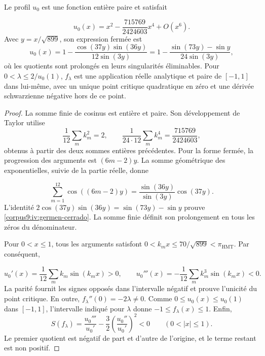 \begin{proposition}
\label{corpus9:iv:germen-analitico}
Le profil \(u_0\) est une fonction entière paire et satisfait

\[
 u_0(x)=x^2-\frac{715769}{2424603}x^4+O(x^6).
\]
Avec \(y=x/\sqrt{899}\), son expression fermée est
\begin{equation}
 u_0(x)
  =1-\frac{\cos(37y)\sin(36y)}{12\sin(3y)}
  =1-\frac{\sin(73y)-\sin y}{24\sin(3y)},
 \label{corpus9:iv:germen-cerrado}
\end{equation}
où les quotients sont prolongés en leurs singularités éliminables.
Pour \(0<\lambda\leq2/u_0(1)\), \(f_\lambda\) est une
application réelle analytique et paire de \([-1,1]\) dans lui-même, avec un
unique point critique quadratique en zéro et une dérivée schwarzienne négative
hors de ce point.
\end{proposition}
\begin{proof}
La somme finie de cosinus est entière et paire. Son développement de
Taylor utilise
\[
 \frac1{12}\sum_m k_m^2=2,\qquad
 \frac1{24\cdot12}\sum_m k_m^4=\frac{715769}{2424603},
\]
obtenus à partir des deux sommes entières précédentes. Pour la forme
fermée, la progression des arguments est \((6m-2)y\). La somme
géométrique des exponentielles, suivie de la partie réelle, donne

\[
 \sum_{m=1}^{12}\cos((6m-2)y)
   =\frac{\sin(36y)}{\sin(3y)}\cos(37y).
\]
L’identité \(2\cos(37y)\sin(36y)=\sin(73y)-\sin y\)
prouve \eqref{corpus9:iv:germen-cerrado}. La somme finie définit
son prolongement en tous les zéros du dénominateur.

Pour \(0<x\leq1\), tous les arguments satisfont
\(0<k_mx\leq70/\sqrt{899}<\pi_{\mathrm{HMT}}\). Par conséquent,

\[
 u_0'(x)=\frac1{12}\sum_m k_m\sin(k_mx)>0,\qquad
 u_0'''(x)=-\frac1{12}\sum_m k_m^3\sin(k_mx)<0.
\]
La parité fournit les signes opposés dans l’intervalle
négatif et prouve l’unicité du point critique. En outre,
\(f_\lambda''(0)=-2\lambda\ne0\). Comme
\(0\leq u_0(x)\leq u_0(1)\) dans \([-1,1]\), l’intervalle
indiqué pour \(\lambda\) donne
\(-1\leq f_\lambda(x)\leq1\). Enfin,
\[
 S(f_\lambda)
  =\frac{u_0'''}{u_0'}
   -\frac32\left(\frac{u_0''}{u_0'}\right)^2<0
 \qquad(0<|x|\leq1).
\]
Le premier quotient est négatif de part et d’autre de l’origine,
et le terme restant est non positif.
\end{proof}

